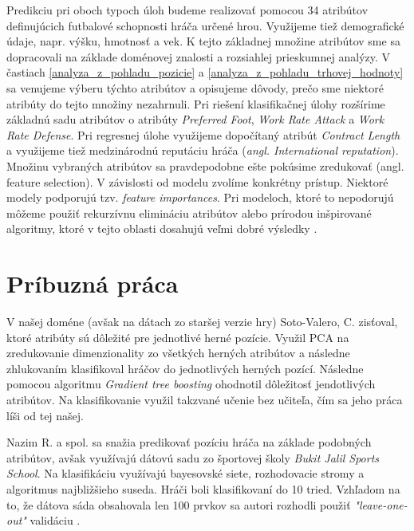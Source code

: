 \documentclass[runningheads]{llncs}
\begin{document}
Predikciu pri oboch typoch úloh budeme realizovať pomocou 34 atribútov definujúcich futbalové schopnosti hráča určené hrou. Využijeme tiež demografické údaje, napr. výšku, hmotnosť a vek. K tejto základnej množine atribútov sme sa dopracovali na základe doménovej znalosti a rozsiahlej prieskumnej analýzy. V častiach \ref{analyza_z_pohladu_pozicie} a \ref{analyza_z_pohladu_trhovej_hodnoty} sa venujeme výberu týchto atribútov a opisujeme dôvody, prečo sme niektoré atribúty do tejto množiny nezahrnuli.
Pri riešení klasifikačnej úlohy rozšírime základnú sadu atribútov o atribúty \textit{Preferred Foot}, \textit{Work Rate Attack} a \textit{Work Rate Defense}. Pri regresnej úlohe využijeme dopočítaný atribút \textit{Contract Length} a využijeme tiež medzinárodnú reputáciu hráča (\textit{angl. International reputation}).
Množinu vybraných atribútov sa pravdepodobne ešte pokúsime zredukovať (angl. feature selection). V závislosti od modelu zvolíme konkrétny prístup. Niektoré modely podporujú tzv. \textit{feature importances}. Pri modeloch, ktoré to nepodorujú môžeme použiť rekurzívnu elimináciu atribútov alebo prírodou inšpirované algoritmy, ktoré v tejto oblasti dosahujú veľmi dobré výsledky \cite{zawbaa2018large}.

\section{Príbuzná práca}

V našej doméne (avšak na dátach zo staršej verzie hry) Soto-Valero, C. \cite{RICYDE1165} zisťoval, ktoré atribúty sú dôležité pre jednotlivé herné pozície. Využil PCA na zredukovanie dimenzionality zo všetkých herných atribútov a následne zhlukovaním klasifikoval hráčov do jednotlivých herných pozící. Následne pomocou algoritmu \textit{Gradient tree boosting} ohodnotil dôležitosť jendotlivých atribútov. Na klasifikovanie využil takzvané učenie bez učiteľa, čím sa jeho práca líši od tej našej.

Nazim R. a spol. sa snažia predikovať pozíciu hráča na základe podobných atribútov, avšak využívajú dátovú sadu zo športovej školy  \textit{Bukit Jalil Sports School}. Na klasifikáciu využívajú bayesovské siete, rozhodovacie stromy a algoritmus najbližšieho suseda. Hráči boli klasifikovaní do 10 tried. Vzhľadom na to, že dátova sáda obsahovala len 100 prvkov sa autori rozhodli použiť \textit{"leave-one-out"} validáciu \cite{razali2017}.  
\end{document}
